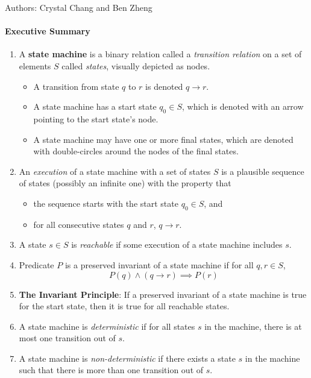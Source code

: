 \documentclass[solution, letterpaper]{cs20inclass}
\begin{document}

\noindent Authors: Crystal Chang and Ben Zheng

\paragraph*{Executive Summary}
\begin{enumerate}

\item A \textbf{state machine} is a binary relation called a \textit{transition relation} on a set of elements $S$ called \textit{states}, visually depicted as nodes.
\begin{itemize}
\item A transition from state $q$ to $r$ is denoted $q \rightarrow r$.
\item A state machine has a start state $q_0 \in S$, which is denoted with an arrow pointing to the start state's node.
\item A state machine may have one or more final states, which are denoted with double-circles around the nodes of the final states.
\end{itemize}
\item An \textit{execution} of a state machine with a set of states $S$ is a plausible sequence of states (possibly an infinite one) with the property that
\begin{itemize}
\item the sequence starts with the start state $q_0 \in S$, and
\item for all consecutive states $q$ and $r$, $q \rightarrow r$.
\end{itemize}
\item A state $s \in S$ is \textit{reachable} if some execution of a state machine includes $s$.
\item Predicate $P$ is a preserved invariant of a state machine if for all $q,r \in S$,
$$P(q) \wedge (q \rightarrow r) \implies P(r)$$
\item \textbf{The Invariant Principle}: If a preserved invariant of a state machine is true for the start state, then it is true for all reachable states.
\item A state machine is \textit{deterministic} if for all states $s$ in the machine, there is at most one transition out of $s$.
\item A state machine is \textit{non-deterministic} if there exists a state $s$ in the machine such that there is more than one transition out of $s$.
\end{enumerate}
\end{document}
